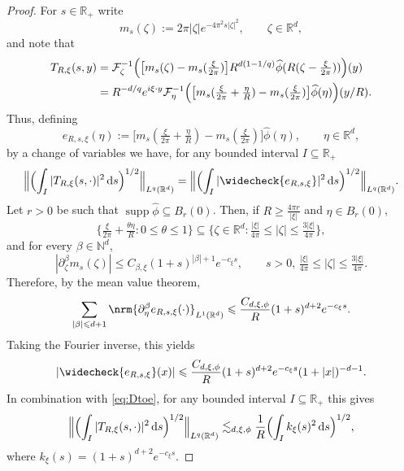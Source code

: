 \documentclass{amsart}
\let\leq\leqslant
\let\geq\geqslant
\theoremstyle{plain}
\theoremstyle{remark}
\theoremstyle{plain}
\numberwithin{equation}{section}
\newcommand{\R}{\mathbb R}
\newcommand{\N}{\mathbb N}
\newcommand{\1}{\mathbf 1}
\newcommand{\dd}{\,{\rm d}}
\newcommand{\mc}{\mathcal}
\DeclarePairedDelimiter{\nrm}\lVert\rVert
\newcommand{\cbraceb}[1]{\bigl\{#1\bigr\}}
\newcommand{\bracb}[1]{\bigl[#1\bigr]}
\newcommand{\nrmB}[1]{\Bigl\|#1\Bigr\|}
\newcommand{\brB}[1]{\Bigl(#1\Bigr)}
\DeclareMathOperator{\supp}{supp}
\begin{document}
\begin{proof}
For $s \in \R_+$ write
\[
  m_s(\zeta):=2\pi|\zeta|e^{-4\pi^2s|\zeta|^2}, \qquad \zeta \in \R^d,
\]
and note that
\[
\begin{aligned}
  T_{R,\xi}(s,y)
  &=
  \mc F^{-1}_\zeta
  \Big(
    \bracb{m_s(\zeta)-m_s(\tfrac{\xi}{2\pi})}
    R^{d(1-1/q)}\widehat\phi(R(\zeta-\tfrac{\xi}{2\pi}))
  \Big)(y)
  \\
  &=
  R^{-d/q}e^{i\xi\cdot y}
  \mc F^{-1}_\eta \brB{\bracb{m_s(\tfrac{\xi}{2\pi}+\tfrac\eta{R})-m_s(\tfrac{\xi}{2\pi})}\widehat\phi(\eta)}(y/R).
\end{aligned}
\]
Thus, defining
\[
  e_{R,s,\xi}(\eta)
  :=
  \bracb{m_s(\tfrac{\xi}{2\pi}+\tfrac\eta{R})-m_s(\tfrac{\xi}{2\pi})}\widehat\phi(\eta), \qquad \eta \in \R^d,
\]
by a change of variables we have, for any bounded interval $I\subseteq \R_+$
\begin{align}\label{eq:Dtoe}
  \nrmB{
    \brB{\int_I |T_{R,\xi}(s,\cdot)|^2\dd s}^{1/2}
  }_{L^q(\R^d)}
  =
  \nrmB{
    \brB{\int_I |\widecheck{e_{R,s,\xi}}|^2\dd s}^{1/2}
  }_{L^q(\R^d)} .
\end{align}
Let $r>0$ be such that $\supp\widehat\phi\subseteq B_r(0)$.  Then, if
$R\geq \tfrac{4\pi r}{|\xi|}$ and $\eta\in B_r(0)$,
\[
\cbraceb{\tfrac{\xi}{2\pi}+\tfrac{\theta\eta}{R}: 0\leq \theta\leq1}
\subseteq
\cbraceb{\zeta \in \R^d:
  \tfrac{|\xi|}{4\pi}\leq |\zeta|\leq \tfrac{3|\xi|}{4\pi}},
\]
and for every
$\beta \in \N^d$,
\begin{equation*}
  |\partial_\zeta^\beta m_s(\zeta)|
  \leq
  C_{\beta,\xi}(1+s)^{|\beta|+1}e^{-c_\xi s},
  \qquad s>0,\,  \tfrac{|\xi|}{4\pi}\leq |\zeta|\leq \tfrac{3|\xi|}{4\pi}.
\end{equation*}
Therefore, by the mean value theorem,
\[
  \sum_{|\beta|\leq d+1}
  \nrm{\partial_\eta^\beta e_{R,s,\xi}(\cdot)}_{L^1(\R^d)}
  \leq
  \frac{C_{d,\xi,\phi}}{R}
  (1+s)^{d+2}e^{-c_\xi s}.
\]
Taking the Fourier inverse, this yields
\[
  |\widecheck{e_{R,s,\xi}}(x)|
  \leq
  \frac{C_{d,\xi,\phi}}{R}
  (1+s)^{d+2}e^{-c_\xi s}(1+|x|)^{-d-1}.
\]
In combination with \eqref{eq:Dtoe}, for any bounded interval $I\subseteq \R_+$ this gives
\begin{equation}\label{eq:step1}
  \nrmB{
    \brB{\int_I |T_{R,\xi}(s,\cdot)|^2\dd s}^{1/2}
  }_{L^q(\R^d)}
  \lesssim_{d,\xi,\phi}
  \frac{1}{R}
  \brB{\int_I k_\xi(s)^2\dd s}^{1/2},
 \end{equation}
where $k_\xi(s)=(1+s)^{d+2}e^{-c_\xi s}$.


\end{proof}
\end{document}
